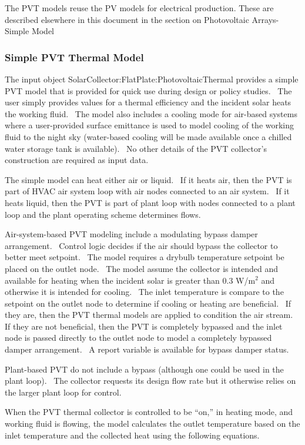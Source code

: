 The PVT models reuse the PV models for electrical production. These are described elsewhere in this document in the section on Photovoltaic Arrays-Simple Model

\subsubsection{Simple PVT Thermal Model}\label{simple-pvt-thermal-model}

The input object SolarCollector:FlatPlate:PhotovoltaicThermal provides a simple PVT model that is provided for quick use during design or policy studies.~ The user simply provides values for a thermal efficiency and the incident solar heats the working fluid.~ The model also includes a cooling mode for air-based systems where a user-provided surface emittance is used to model cooling of the working fluid to the night sky (water-based cooling will be made available once a chilled water storage tank is available).~ No other details of the PVT collector's construction are required as input data.

The simple model can heat either air or liquid.~ If it heats air, then the PVT is part of HVAC air system loop with air nodes connected to an air system.~ If it heats liquid, then the PVT is part of plant loop with nodes connected to a plant loop and the plant operating scheme determines flows.

Air-system-based PVT modeling include a modulating bypass damper arrangement.~ Control logic decides if the air should bypass the collector to better meet setpoint.~ The model requires a drybulb temperature setpoint be placed on the outlet node.~ The model assume the collector is intended and available for heating when the incident solar is greater than 0.3 W/m\(^{2}\) and otherwise it is intended for cooling.~ The inlet temperature is compare to the setpoint on the outlet node to determine if cooling or heating are beneficial.~ If they are, then the PVT thermal models are applied to condition the air stream.~ If they are not beneficial, then the PVT is completely bypassed and the inlet node is passed directly to the outlet node to model a completely bypassed damper arrangement.~ A report variable is available for bypass damper status.

Plant-based PVT do not include a bypass (although one could be used in the plant loop).~ The collector requests its design flow rate but it otherwise relies on the larger plant loop for control.

When the PVT thermal collector is controlled to be ``on,'' in heating mode, and working fluid is flowing, the model calculates the outlet temperature based on the inlet temperature and the collected heat using the following equations.

